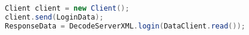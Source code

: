 \begin{lstlisting}[label={lst:facadepattern}, caption={Abstraction of the login data}, language=java]
Client client = new Client();
client.send(LoginData);
ResponseData = DecodeServerXML.login(DataClient.read());
\end{lstlisting} 

